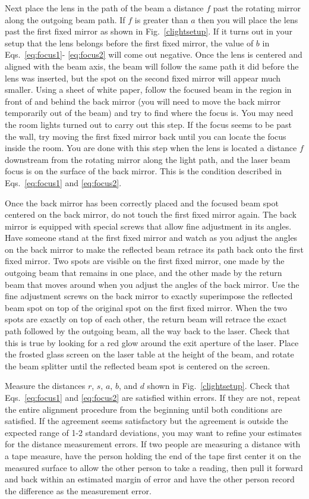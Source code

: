 \documentclass{revtex4}
\begin{document}
Next place the lens in the path of the beam a distance $f$ past the rotating
mirror along the outgoing beam path.  If $f$ is greater than $a$ then you
will place the lens past the first fixed mirror as shown in
Fig.~\ref{clightsetup}.  If it turns out in your setup that the lens belongs
before the first fixed mirror, the value of $b$ in Eqs.~\ref{eq:focus1}-
\ref{eq:focus2} will come out negative.  Once the lens is centered and
aligned with the beam axis, the beam will follow the same path it did 
before the lens was inserted, but the spot on the second fixed mirror will
appear much smaller.  Using a sheet of white paper, follow the focused
beam in the region in front of and behind the back mirror (you will need
to move the back mirror temporarily out of the beam) and try to find where
the focus is.  You may need the room lights turned out to carry out this
step.  If the focus seems to be past the wall, try moving the first fixed
mirror back until you can locate the focus inside the room.  You are done
with this step when the lens is located a distance $f$ downstream from the
rotating mirror along the light path, and the laser beam focus is on the
surface of the back mirror.  This is the condition described in 
Eqs.~\ref{eq:focus1} and \ref{eq:focus2}.

Once the back mirror has been correctly placed and the focused beam spot
centered on the back mirror, do not touch the first fixed mirror again.
The back mirror is equipped with special screws that allow fine adjustment
in its angles.  Have someone stand at the first fixed mirror and watch
as you adjust the angles on the back mirror to make the reflected beam
retrace its path back onto the first fixed mirror.  Two spots are visible
on the first fixed mirror, one made by the outgoing beam that remains in
one place, and the other made by the return beam that moves around when you
adjust the angles of the back mirror.  Use the fine adjustment screws on
the back mirror to exactly superimpose the reflected beam spot on top of the
original spot on the first fixed mirror.  When the two spots are exactly
on top of each other, the return beam will retrace the exact path followed
by the outgoing beam, all the way back to the laser.  Check that this is
true by looking for a red glow around the exit aperture of the laser.
Place the frosted glass screen on the laser table at the height of the
beam, and rotate the beam splitter until the reflected beam spot is centered
on the screen.

Measure the distances $r$, $s$, $a$, $b$, and $d$ shown in
Fig.~\ref{clightsetup}.  Check that Eqs.~\ref{eq:focus1} and \ref{eq:focus2}
are satisfied within errors.  If they are not, repeat the entire alignment
procedure from the beginning until both conditions are satisfied.  If the
agreement seems satisfactory but the agreement is outside the expected
range of 1-2 standard deviations, you may want to refine your estimates for
the distance measurement errors.  If two people are measuring a distance
with a tape measure, have the person holding the end of the tape first
center it on the measured surface to allow the other person to take a
reading, then pull it forward and back within an estimated margin of error
and have the other person record the difference as the measurement error.
\end{document}
